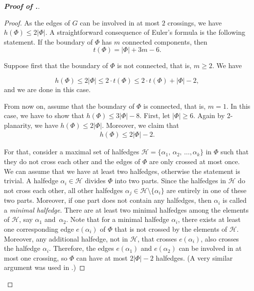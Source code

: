 \documentclass[10pt]{article}
\theoremstyle{definition}
\begin{document}
\begin{proof}[\bf Proof of .]
\begin{proof}
As the edges of $G$ can be involved in at most $2$ crossings, we have $h(\Phi) \leq 2 |\Phi|$. A straightforward consequence of Euler's formula is the following statement. If the boundary of $\Phi$ has $m$ connected components, then
\begin{equation} \label{Euler_consequence}
t(\Phi)=|\Phi|+3m-6. 
\end{equation}

Suppose first that the boundary of $\Phi$ is not connected, that is, $m \geq 2$. We have

$$h(\Phi) \leq 2 |\Phi| \leq 2\cdot t(\Phi) \leq 2 \cdot t(\Phi) + |\Phi| -2,$$
and we are done in this case.

\smallskip

From now on, assume that the boundary of $\Phi$ is connected, that is, $m=1$. 
In this case, we have to show that $h(\Phi) \leq 3 |\Phi|-8$. First, let $|\Phi| \geq 6$. 
Again by 2-planarity, we have $h(\Phi) \leq 2 |\Phi|$. Moreover, we claim that 
\begin{align} \label{minimalhalfedges}
    h(\Phi) \leq 2 |\Phi| -2.
\end{align}

For that, consider a maximal set of halfedges 
$\mathcal{H}= \{ \alpha_1, \, \alpha_2, \,  \dots, \alpha_k \}$ 
in $\Phi$ such that they do not cross each other 
and the edges of $\Phi$ are only crossed at most once. 
We can assume that we have at least two halfedges, otherwise the statement is trivial. 
A halfedge $\alpha_i \in \mathcal{H}$ divides $\Phi$ into two parts. 
Since the halfedges in $\mathcal{H}$ do not cross each other, 
all other halfedges $\alpha_j \in \mathcal{H} \setminus \{\alpha_i\}$ are entirely in one of these two parts.  
Moreover, if one part does not contain any halfedges, then $\alpha_i$ is called a {\em minimal halfedge}. 
There are at least 
two minimal halfedges among the elements of $\mathcal{H}$, say $\alpha_1$ and~$\alpha_2$. 
Note that for a minimal halfedge $\alpha_i$, there exists at least one corresponding edge 
$e(\alpha_i)$ of $\Phi$ that is not crossed by the elements of $\mathcal{H}$. 
Moreover, any additional halfedge, not in $\mathcal{H}$, 
that crosses $e(\alpha_i)$, also crosses the halfedge $\alpha_i$. 
Therefore, the edges $e(\alpha_1)$ and $e(\alpha_2)$ 
can be involved in at most one crossing, so $\Phi$ can have at most $2|\Phi| -2$ halfedges.
(A very similar argument was used in \cite{GT25}.)


\end{proof}
\end{proof}
\end{document}
